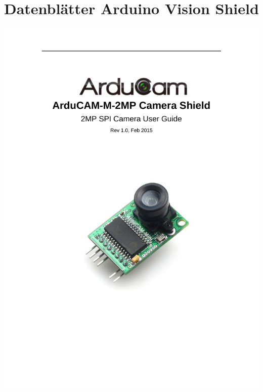 %
%


\chapter{Datenblätter Arduino Vision Shield}


\setcounter{VScounter}{1}

{
	\includegraphics[width=1\textwidth,page=\theVScounter]{../../MLbib/Arduino/ArduCAM/ArduCAM_Mini_2MP_Camera_Shield_DS.pdf}
	\newpage
}

\setcounter{VScounter}{1}

